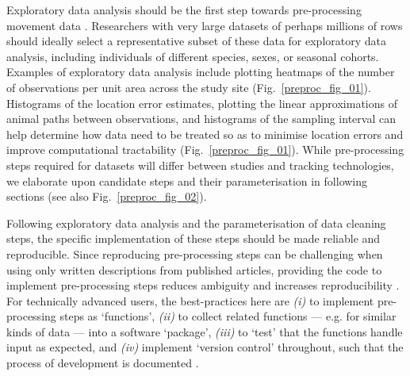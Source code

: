     Exploratory data analysis should be the first step towards pre-processing movement data \citep[see Fig.~\ref{preproc_fig_01};][]{slingsby2016}.
    Researchers with very large datasets of perhaps millions of rows should ideally select a representative subset of these data for exploratory data analysis, including individuals of different species, sexes, or seasonal cohorts.
    Examples of exploratory data analysis include plotting heatmaps of the number of observations per unit area across the study site (Fig.~\ref{preproc_fig_01}).
    Histograms of the location error estimates, plotting the linear approximations of animal paths between observations, and histograms of the sampling interval can help determine how data need to be treated so as to minimise location errors and improve computational tractability (Fig.~\ref{preproc_fig_01}).
    While pre-processing steps required for datasets will differ between studies and tracking technologies, we elaborate upon candidate steps and their parameterisation in following sections (see also Fig.~\ref{preproc_fig_02}).

    Following exploratory data analysis and the parameterisation of data cleaning steps, the specific implementation of these steps should be made reliable and reproducible.
    Since reproducing pre-processing steps can be challenging when using only written descriptions from published articles, providing the code to implement pre-processing steps reduces ambiguity and increases reproducibility \citep{haddaway2015}.
    For technically advanced users, the best-practices here are \textit{(i)} to implement pre-processing steps as `functions', \textit{(ii)} to collect related functions --- e.g. for similar kinds of data --- into a software `package', \textit{(iii)} to `test' that the functions handle input as expected, and \textit{(iv)} implement `version control' throughout, such that the process of development is documented \citep[Fig.~\ref{preproc_fig_01};][]{wickham2015,alston2020,perez-riverol2016}.

